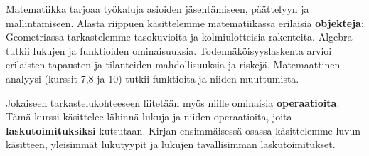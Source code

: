Matematiikka tarjoaa työkaluja asioiden jäsentämiseen, päättelyyn ja mallintamiseen. Alasta riippuen käsittelemme matematiikassa erilaisia \textbf{objekteja}: Geometriassa tarkastelemme tasokuvioita ja kolmiulotteisia rakenteita. Algebra tutkii lukujen ja funktioiden ominaisuuksia. Todennäköisyyslaskenta arvioi erilaisten tapausten ja tilanteiden mahdollisuuksia ja riskejä. Matemaattinen analyysi (kurssit 7,8 ja 10) tutkii funktioita ja niiden muuttumista.

Jokaiseen tarkastelukohteeseen liitetään myös niille ominaisia \textbf{operaatioita}. Tämä kurssi käsittelee lähinnä lukuja ja niiden operaatioita, joita \textbf{laskutoimituksiksi} kutsutaan. Kirjan ensimmäisessä osassa käsittelemme luvun käsitteen, yleisimmät lukutyypit ja lukujen tavallisimman laskutoimitukset.

\newcommand{\abc}{abcdefgh\hbar\hslash i\imath j\jmath klmnopqrstuvwxyz}
\newcommand{\ABC}{ABCDEFGHIJKLMNOPQRSTUVWXYZ}
\newcommand{\alphabeta}{\alpha\beta\varbeta\gamma\delta\epsilon\varepsilon\zeta\eta\theta\vartheta\iota\kappa\varkappa\lambda\mu\nu\xi o\pi\varpi\rho\varrho\sigma\varsigma\tau\upsilon\phi\varphi\chi\psi\omega}
\newcommand{\AlphaBeta}{\Gamma\Delta\Theta\Lambda\Xi\Pi\Sigma\Upsilon\Phi\Psi\Omega}










